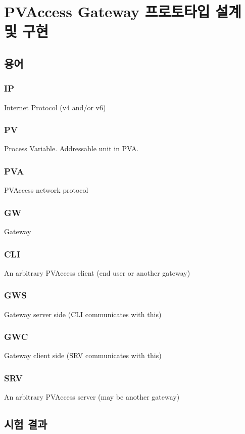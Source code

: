 \documentclass[11pt
  , a4paper
  , article
  , oneside
]{memoir}
\begin{document}
\section{PVAccess Gateway 프로토타입 설계 및 구현}
\subsection{용어}

\subsubsection{IP}
Internet Protocol (v4 and/or v6)

\subsubsection{PV}
Process Variable. Addressable unit in PVA.

\subsubsection{PVA}
PVAccess network protocol

\subsubsection{GW}
Gateway

\subsubsection{CLI}
An arbitrary PVAccess client (end user or another gateway)

\subsubsection{GWS}
Gateway server side (CLI communicates with this)

\subsubsection{GWC}
Gateway client side (SRV communicates with this)

\subsubsection{SRV}
An arbitrary PVAccess server (may be another gateway)



\subsection{시험 결과}



















\clearpage


\end{document}
